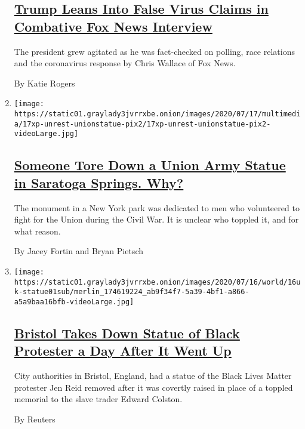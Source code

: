 \begin{enumerate}
  \hypertarget{trump-leans-into-false-virus-claims-in-combative-fox-news-interview}{%
  \subsection{\texorpdfstring{\href{/2020/07/19/us/politics/trump-fox-interview-coronavirus-race.html}{Trump
  Leans Into False Virus Claims in Combative Fox News
  Interview}}{Trump Leans Into False Virus Claims in Combative Fox News Interview}}\label{trump-leans-into-false-virus-claims-in-combative-fox-news-interview}}

  The president grew agitated as he was fact-checked on polling, race
  relations and the coronavirus response by Chris Wallace of Fox News.

  By Katie Rogers
\item
  \texttt{[image: https://static01.graylady3jvrrxbe.onion/images/2020/07/17/multimedia/17xp-unrest-unionstatue-pix2/17xp-unrest-unionstatue-pix2-videoLarge.jpg]}

  \hypertarget{someone-tore-down-a-union-army-statue-in-saratoga-springs-why}{%
  \subsection{\texorpdfstring{\href{/2020/07/18/us/union-statue-saratoga-springs-ny.html}{Someone
  Tore Down a Union Army Statue in Saratoga Springs.
  Why?}}{Someone Tore Down a Union Army Statue in Saratoga Springs. Why?}}\label{someone-tore-down-a-union-army-statue-in-saratoga-springs-why}}

  The monument in a New York park was dedicated to men who volunteered
  to fight for the Union during the Civil War. It is unclear who toppled
  it, and for what reason.

  By Jacey Fortin and Bryan Pietsch
\item
  \texttt{[image: https://static01.graylady3jvrrxbe.onion/images/2020/07/16/world/16uk-statue01sub/merlin\_174619224\_ab9f34f7-5a39-4bf1-a866-a5a9baa16bfb-videoLarge.jpg]}

  \hypertarget{bristol-takes-down-statue-of-black-protester-a-day-after-it-went-up}{%
  \subsection{\texorpdfstring{\href{/video/us/politics/100000007242014/bristol-jen-reid-statute-removed.html}{Bristol
  Takes Down Statue of Black Protester a Day After It Went
  Up}}{Bristol Takes Down Statue of Black Protester a Day After It Went Up}}\label{bristol-takes-down-statue-of-black-protester-a-day-after-it-went-up}}

  City authorities in Bristol, England, had a statue of the Black Lives
  Matter protester Jen Reid removed after it was covertly raised in
  place of a toppled memorial to the slave trader Edward Colston.

  By Reuters
\end{enumerate}

